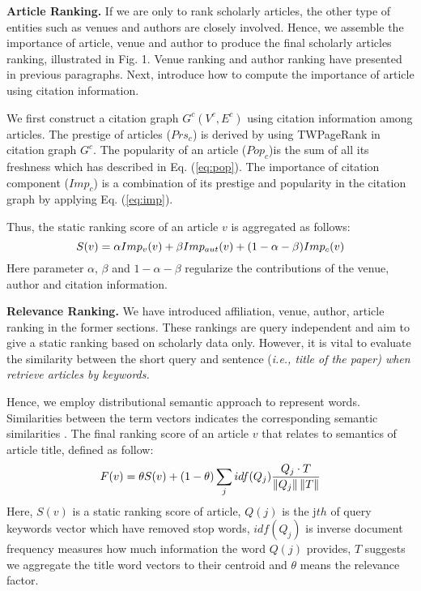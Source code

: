 \textbf{Article Ranking.}
If we are only to rank scholarly articles, the other type of entities such as venues and authors are closely involved. Hence, we assemble the importance of article, venue and author to produce the final scholarly articles ranking, illustrated in Fig. 1. Venue ranking and author ranking have presented in previous paragraphs. Next, introduce how to compute the importance of article using citation information.

\par
We first construct a citation graph $G^c(V^c, E^c)$ using citation information among articles. The prestige of articles ($Prs_c$) is derived by using TWPageRank in citation graph $G^c$. The popularity of an article ($Pop_c$)is the sum of all its freshness which has described in Eq. (\ref{eq:pop}). The importance of citation component ($Imp_c$) is a combination of its prestige and popularity in the citation graph by applying Eq. (\ref{eq:imp}).

\par
Thus, the static ranking score of an article $v$ is aggregated as follows:
\begin{equation}
\centering
\label{eq:assemble}
S(v) = \alpha Imp_v(v) + \beta Imp_{aut}(v) + (1 - \alpha - \beta)Imp_c(v)
\end{equation}
Here parameter $\alpha$, $\beta$ and $1- \alpha - \beta$  regularize the contributions of the venue, author and citation information.


\textbf{Relevance Ranking.} We have introduced affiliation, venue, author, article ranking in the former sections. These rankings are query independent and
aim to give a static ranking based on scholarly data only. However, it is vital to evaluate the similarity between the short query and sentence (\itshape i.e., \upshape title of the paper) when retrieve articles by keywords.

\par
Hence, we employ distributional semantic approach to represent words. Similarities between the term vectors indicates the corresponding semantic similarities \cite{corrado2013efficient}. The final ranking score of an article $v$ that relates to semantics of article title, defined as follow:
\begin{equation}
\centering
\label{eq:simscore}
F(v) = \theta S(v) + (1- \theta) \sum_j idf(Q_j) \frac {Q_j \cdot T} {\left \| Q_j \right \| \left \| T \right \|}
\end{equation}
Here, $S(v)$ is a static ranking score of article, $Q(j)$ is the j$th$ of query keywords vector which have removed stop words, $idf(Q_j)$ is inverse document frequency measures how much information the word $Q(j)$ provides, $T$ suggests we aggregate the title word vectors to their centroid and $\theta$ means the relevance factor.
